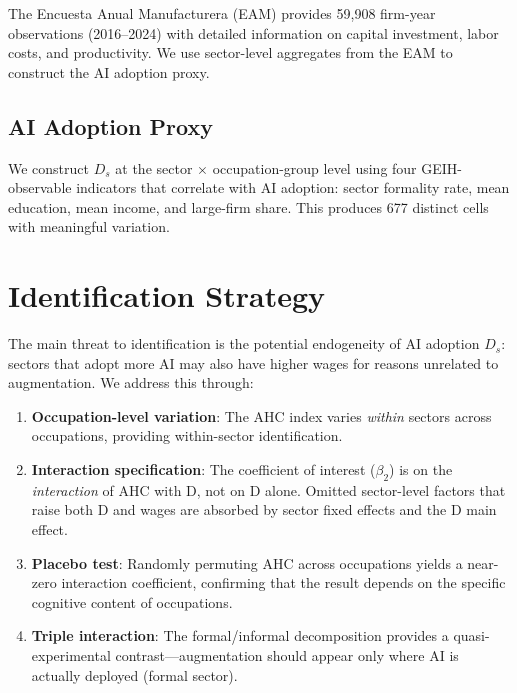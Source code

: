 \documentclass[12pt,a4paper]{article}
\begin{document}
The Encuesta Anual Manufacturera (EAM) provides 59,908 firm-year observations (2016--2024) with detailed information on capital investment, labor costs, and productivity. We use sector-level aggregates from the EAM to construct the AI adoption proxy.

\subsection{AI Adoption Proxy}

We construct $D_s$ at the sector $\times$ occupation-group level using four GEIH-observable indicators that correlate with AI adoption: sector formality rate, mean education, mean income, and large-firm share. This produces 677 distinct cells with meaningful variation.


\section{Identification Strategy}
\label{sec:identification}

The main threat to identification is the potential endogeneity of AI adoption $D_s$: sectors that adopt more AI may also have higher wages for reasons unrelated to augmentation. We address this through:

\begin{enumerate}
\item \textbf{Occupation-level variation}: The AHC index varies \textit{within} sectors across occupations, providing within-sector identification.
\item \textbf{Interaction specification}: The coefficient of interest ($\beta_2$) is on the \textit{interaction} of AHC with D, not on D alone. Omitted sector-level factors that raise both D and wages are absorbed by sector fixed effects and the D main effect.
\item \textbf{Placebo test}: Randomly permuting AHC across occupations yields a near-zero interaction coefficient, confirming that the result depends on the specific cognitive content of occupations.
\item \textbf{Triple interaction}: The formal/informal decomposition provides a quasi-experimental contrast---augmentation should appear only where AI is actually deployed (formal sector).
\end{enumerate}


\end{document}
